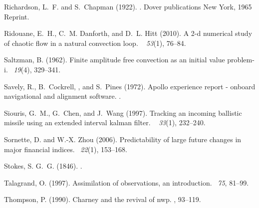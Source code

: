 \documentclass[12pt]{report}
\begin{document}
\begin{thebibliography}{}
Richardson, L.~F. and S.~Chapman (1922).
.
\newblock Dover publications New York, 1965 Reprint.

Ridouane, E.~H., C.~M. Danforth, and D.~L. Hitt (2010).
\newblock A 2-d numerical study of chaotic flow in a natural convection loop.
~{\em
  53\/}(1), 76--84.

Saltzman, B. (1962).
\newblock Finite amplitude free convection as an initial value problem-i.
~{\em 19\/}(4), 329--341.

Savely, R., B.~Cockrell, , and S.~Pines (1972).
\newblock Apollo experience report - onboard navigational and alignment
  software.
.

Siouris, G.~M., G.~Chen, and J.~Wang (1997).
\newblock Tracking an incoming ballistic missile using an extended interval
  kalman filter.
~{\em
  33\/}(1), 232--240.

Sornette, D. and W.-X. Zhou (2006).
\newblock Predictability of large future changes in major financial indices.
~{\em 22\/}(1), 153--168.

Stokes, S. G.~G. (1846).
.

Talagrand, O. (1997).
\newblock Assimilation of observations, an introduction.
~{\em 75},
  81--99.

Thompson, P. (1990).
\newblock Charney and the revival of nwp.
, 93--119.


\end{thebibliography}
\end{document}
